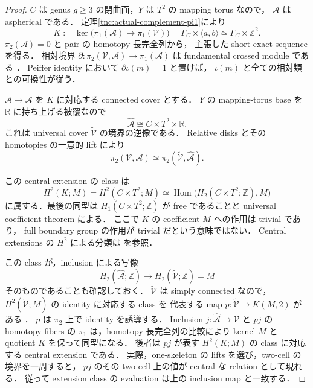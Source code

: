 \begin{proof}
$C$ は genus $g\ge3$ の閉曲面，$Y$ は $T^2$ の mapping torus なので，
$\mathcal A$ は aspherical である．
定理\ref{tnc:actual-complement-pi1}により
\[
 K:=\ker\bigl(\pi_1(\mathcal A)\to\pi_1(\mathcal V)\bigr)
   =\Gamma_C\times\langle a,b\rangle
   \simeq\Gamma_C\times\mathbb Z^2.
\]
$\pi_2(\mathcal A)=0$ と pair の homotopy 長完全列から，
主張した short exact sequence を得る．
相対境界 $\partial:\pi_2(\mathcal V,\mathcal A)\to\pi_1(\mathcal A)$
は fundamental crossed module である
\cite[Section~2]{brown-relative-pi2}．
Peiffer identity において $\partial\iota(m)=1$ と置けば，
$\iota(m)$ と全ての相対類との可換性が従う．

$\widehat{\mathcal A}\to\mathcal A$ を $K$ に対応する connected cover とする．
$Y$ の mapping-torus base を $\mathbb R$ に持ち上げる被覆なので
\[
 \widehat{\mathcal A}\cong C\times T^2\times\mathbb R.
\]
これは universal cover $\widetilde{\mathcal V}$ の境界の逆像である．
Relative disks とその homotopies の一意的 lift により
\[
 \pi_2(\mathcal V,\mathcal A)
   \simeq\pi_2(\widetilde{\mathcal V},\widehat{\mathcal A}).
\]

この central extension の class は
\[
 H^2(K;M)=H^2(C\times T^2;M)
   \simeq\operatorname{Hom}\bigl(H_2(C\times T^2;\mathbb Z),M\bigr)
\]
に属する．最後の同型は $H_1(C\times T^2;\mathbb Z)$ が free であることと
universal coefficient theorem による．
ここで $K$ の coefficient $M$ への作用は trivial であり，
full boundary group の作用が trivial だという意味ではない．
Central extensions の $H^2$ による分類は
\cite[Section~2]{conrad-group-extensions}を参照．

この class が，inclusion による写像
\[
 H_2(\widehat{\mathcal A};\mathbb Z)
   \longrightarrow H_2(\widetilde{\mathcal V};\mathbb Z)=M
\]
そのものであることも確認しておく．
$\widetilde{\mathcal V}$ は simply connected なので，
$H^2(\widetilde{\mathcal V};M)$ の identity に対応する class を
代表する map $p:\widetilde{\mathcal V}\to K(M,2)$ がある
\cite[Theorem~4.57]{hatcher-bct}．
$p$ は $\pi_2$ 上で identity を誘導する．
Inclusion $j:\widehat{\mathcal A}\to\widetilde{\mathcal V}$ と
$p j$ の homotopy fibers の $\pi_1$ は，homotopy 長完全列の比較により
kernel $M$ と quotient $K$ を保って同型になる．
後者は $p j$ が表す $H^2(K;M)$ の class に対応する central extension である．
実際，one-skeleton の lifts を選び，two-cell の境界を一周すると，
$p j$ のその two-cell 上の値が central な relation として現れる．
従って extension class の evaluation は上の inclusion map と一致する．


\end{proof}
